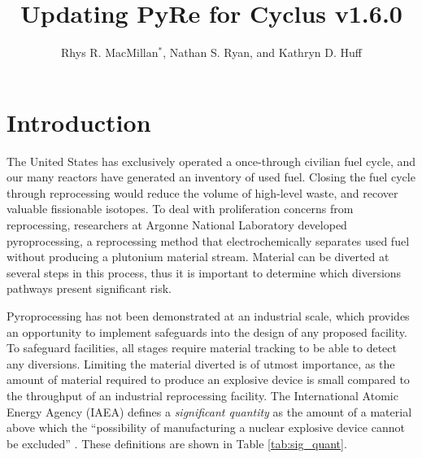 \documentclass{anstrans}
\title{Updating PyRe for Cyclus v1.6.0}
\author{Rhys R. MacMillan$^{*}$, Nathan S. Ryan, and Kathryn D. Huff}
\institute{
Advanced Reactors and Fuel Cycles Group, University of Illinois, Urbana IL\\
$^{*}$rhysrm2@illinois.edu
}
\begin{document}
\section{Introduction}
The United States has exclusively operated a once-through civilian fuel cycle, and our many reactors have generated an inventory of used fuel. Closing the fuel cycle through reprocessing would reduce the volume of high-level waste, and recover valuable fissionable isotopes. To deal with proliferation concerns from reprocessing, researchers at Argonne National Laboratory developed pyroprocessing, a reprocessing method that electrochemically separates used fuel without producing a plutonium material stream. Material can be diverted at several steps in this process, thus it is important to determine which diversions pathways present significant risk.

Pyroprocessing has not been demonstrated at an industrial scale, which provides an opportunity to implement safeguards into the design of any proposed facility. To safeguard facilities, all stages require material tracking to be able to detect any diversions. Limiting the material diverted is of utmost importance, as the amount of material required to produce an explosive device is small compared to the throughput of an industrial reprocessing facility. The International Atomic Energy Agency (IAEA) defines a \emph{significant quantity} as the amount of a material above which the ``possibility of manufacturing a nuclear explosive device cannot be excluded'' \cite{schanfein_iaea_2021}. These definitions are shown in Table \ref{tab:sig_quant}.

\end{document}
